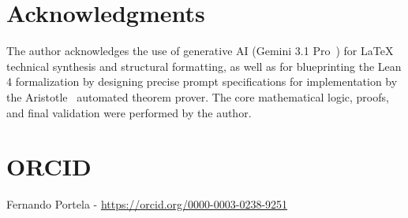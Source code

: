 \documentclass{ws-ijnt}
\begin{document}
\section*{Acknowledgments}
The author acknowledges the use of generative AI (Gemini 3.1 Pro~\cite{geminiteam2025}) for LaTeX
technical synthesis and structural formatting, as well as for blueprinting the Lean 4 formalization
by designing precise prompt specifications for implementation by the Aristotle~\cite{Achim2025}
automated theorem prover. The core mathematical logic, proofs, and final validation were performed
by the author.

\section*{ORCID}

\noindent Fernando Portela - \url{https://orcid.org/0000-0003-0238-9251}




\end{document}
